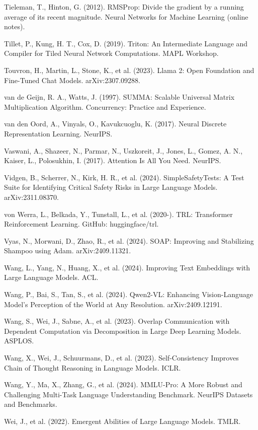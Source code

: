 {\begin{enumerate}[leftmargin=*,itemsep=1pt,label={[\arabic*]}]
\item Tieleman, T., Hinton, G. (2012). RMSProp: Divide the gradient by a running average of its recent magnitude. Neural Networks for Machine Learning (online notes).
\item Tillet, P., Kung, H. T., Cox, D. (2019). Triton: An Intermediate Language and Compiler for Tiled Neural Network Computations. MAPL Workshop.
\item Touvron, H., Martin, L., Stone, K., et al. (2023). Llama 2: Open Foundation and Fine-Tuned Chat Models. arXiv:2307.09288.
\item van de Geijn, R. A., Watts, J. (1997). SUMMA: Scalable Universal Matrix Multiplication Algorithm. Concurrency: Practice and Experience.
\item van den Oord, A., Vinyals, O., Kavukcuoglu, K. (2017). Neural Discrete Representation Learning. NeurIPS.
\item Vaswani, A., Shazeer, N., Parmar, N., Uszkoreit, J., Jones, L., Gomez, A. N., Kaiser, L., Polosukhin, I. (2017). Attention Is All You Need. NeurIPS.
\item Vidgen, B., Scherrer, N., Kirk, H. R., et al. (2024). SimpleSafetyTests: A Test Suite for Identifying Critical Safety Risks in Large Language Models. arXiv:2311.08370.
\item von Werra, L., Belkada, Y., Tunstall, L., et al. (2020-). TRL: Transformer Reinforcement Learning. GitHub: huggingface/trl.
\item Vyas, N., Morwani, D., Zhao, R., et al. (2024). SOAP: Improving and Stabilizing Shampoo using Adam. arXiv:2409.11321.
\item Wang, L., Yang, N., Huang, X., et al. (2024). Improving Text Embeddings with Large Language Models. ACL.
\item Wang, P., Bai, S., Tan, S., et al. (2024). Qwen2-VL: Enhancing Vision-Language Model's Perception of the World at Any Resolution. arXiv:2409.12191.
\item Wang, S., Wei, J., Sabne, A., et al. (2023). Overlap Communication with Dependent Computation via Decomposition in Large Deep Learning Models. ASPLOS.
\item Wang, X., Wei, J., Schuurmans, D., et al. (2023). Self-Consistency Improves Chain of Thought Reasoning in Language Models. ICLR.
\item Wang, Y., Ma, X., Zhang, G., et al. (2024). MMLU-Pro: A More Robust and Challenging Multi-Task Language Understanding Benchmark. NeurIPS Datasets and Benchmarks.
\item Wei, J., et al. (2022). Emergent Abilities of Large Language Models. TMLR.

\end{enumerate}}
